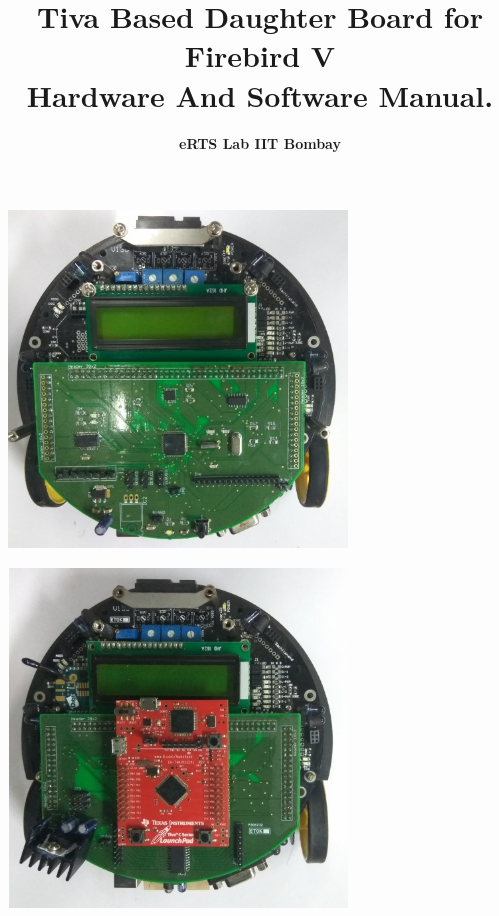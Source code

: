 \documentclass[a4paper,10pt,oneside]{article}
\title{\Huge{\textbf{Tiva Based Daughter Board for Firebird V \\ Hardware And Software Manual.}}}
\author{\textbf{ eRTS Lab IIT Bombay}}
\begin{document}
	\large
	\maketitle
		\begin{center}
			\includegraphics[width=9cm, height=9cm]{uC_DB} \\
		\end{center}
		
		\begin{center}
			\includegraphics[width=9cm, height=9cm]{Plug_Play_DB}
		\end{center}
	
	\newpage
\end{document}
